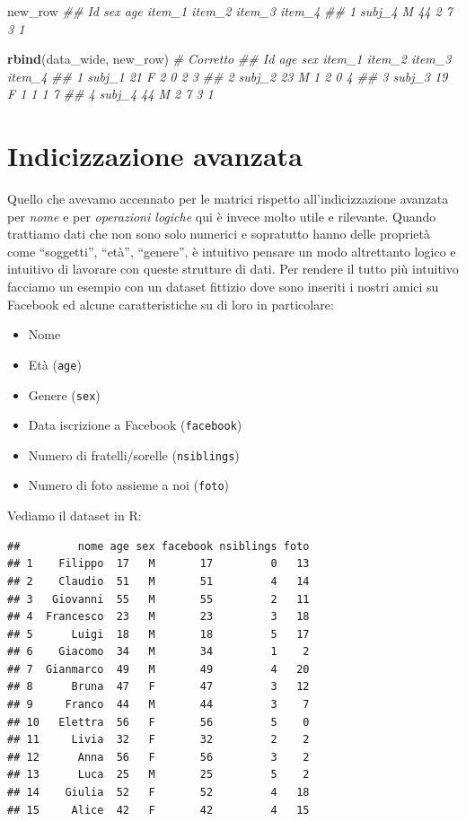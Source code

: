 \documentclass[
]{book}
\newenvironment{Shaded}{\begin{snugshade}}{\end{snugshade}}
\newcommand{\CommentTok}[1]{\textcolor[rgb]{0.56,0.35,0.01}{\textit{#1}}}
\newcommand{\KeywordTok}[1]{\textcolor[rgb]{0.13,0.29,0.53}{\textbf{#1}}}
\newcommand{\NormalTok}[1]{#1}
\providecommand{\tightlist}{%
  \setlength{\itemsep}{0pt}\setlength{\parskip}{0pt}}
\begin{document}
\begin{Shaded}
\begin{Highlighting}[]
\NormalTok{new_row}
\CommentTok{##       Id sex age item_1 item_2 item_3 item_4}
\CommentTok{## 1 subj_4   M  44      2      7      3      1}

\KeywordTok{rbind}\NormalTok{(data_wide, new_row) }\CommentTok{# Corretto}
\CommentTok{##       Id age sex item_1 item_2 item_3 item_4}
\CommentTok{## 1 subj_1  21   F      2      0      2      3}
\CommentTok{## 2 subj_2  23   M      1      2      0      4}
\CommentTok{## 3 subj_3  19   F      1      1      1      7}
\CommentTok{## 4 subj_4  44   M      2      7      3      1}
\end{Highlighting}
\end{Shaded}

\hypertarget{indicizzazione-avanzata}{%
\section{Indicizzazione avanzata}\label{indicizzazione-avanzata}}

Quello che avevamo accennato per le matrici rispetto all'indicizzazione avanzata per \emph{nome} e per \emph{operazioni logiche} qui è invece molto utile e rilevante. Quando trattiamo dati che non sono solo numerici e sopratutto hanno delle proprietà come ``soggetti'', ``età'', ``genere'', è intuitivo pensare un modo altrettanto logico e intuitivo di lavorare con queste strutture di dati. Per rendere il tutto più intuitivo facciamo un esempio con un dataset fittizio dove sono inseriti i nostri amici su Facebook ed alcune caratteristiche su di loro in particolare:

\begin{itemize}
\tightlist
\item
  Nome
\item
  Età (\texttt{age})
\item
  Genere (\texttt{sex})
\item
  Data iscrizione a Facebook (\texttt{facebook})
\item
  Numero di fratelli/sorelle (\texttt{nsiblings})
\item
  Numero di foto assieme a noi (\texttt{foto})
\end{itemize}

Vediamo il dataset in R:

\begin{verbatim}
##         nome age sex facebook nsiblings foto
## 1    Filippo  17   M       17         0   13
## 2    Claudio  51   M       51         4   14
## 3   Giovanni  55   M       55         2   11
## 4  Francesco  23   M       23         3   18
## 5      Luigi  18   M       18         5   17
## 6    Giacomo  34   M       34         1    2
## 7  Gianmarco  49   M       49         4   20
## 8      Bruna  47   F       47         3   12
## 9     Franco  44   M       44         3    7
## 10   Elettra  56   F       56         5    0
## 11     Livia  32   F       32         2    2
## 12      Anna  56   F       56         3    2
## 13      Luca  25   M       25         5    2
## 14    Giulia  52   F       52         4   18
## 15     Alice  42   F       42         4   15
\end{verbatim}
\end{document}

